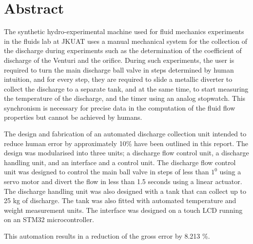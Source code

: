 \section*{Abstract}
\label{sec:}
\par
The synthetic hydro-experimental machine used for fluid mechanics experiments in the fluids lab at JKUAT uses a manual mechanical system for the collection of the discharge during experiments such as the determination of the coefficient of discharge of the Venturi and the orifice. During such experiments, the user is required to turn the main discharge ball valve in steps determined by human intuition, and for every step, they are required to slide a metallic diverter to collect the discharge to a separate tank, and at the same time, to start measuring the temperature of the discharge, and the timer using an analog stopwatch. This synchronism is necessary for precise data in the computation of the fluid flow properties but cannot be achieved by humans. 
\par
The design and fabrication of an automated discharge collection unit intended to reduce human error by approximately 10\% have been outlined in this report. The design was modularised into three units; a discharge flow control unit, a discharge handling unit, and an interface and a control unit. The discharge flow control unit was designed to control the main ball valve in steps of less than $1^0$ using a servo motor and divert the flow in less than 1.5 seconds using a linear actuator. The discharge handling unit was also designed with a tank that can collect up to 25 kg of discharge. The tank was also fitted with automated temperature and weight measurement units. The interface was designed on a touch LCD running on an STM32 microcontroller.
\par
This automation results in a reduction of the gross error by 8.213 \%.